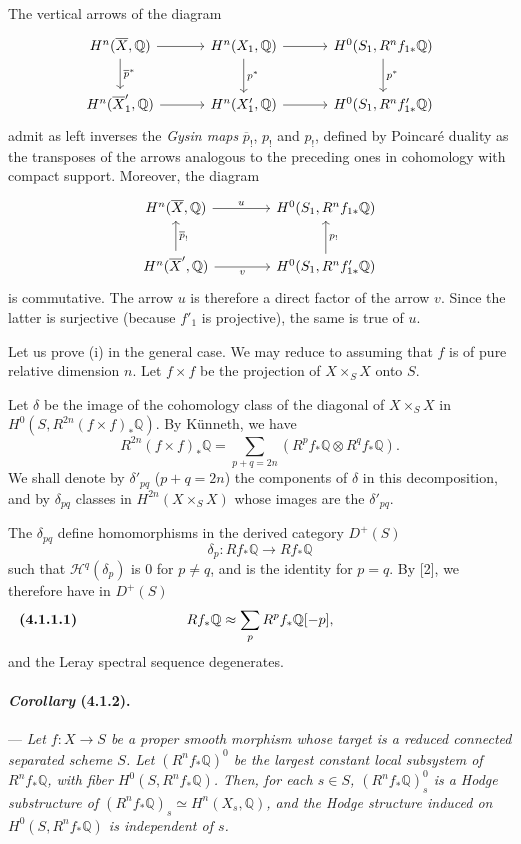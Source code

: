 \documentclass[10pt]{article}
\newcommand{\Q}{\mathbb Q}
\begin{document}
The vertical arrows of the diagram
\[
\begin{tikzcd}[column sep=3.2em,row sep=2.2em]
H^n(\overline X,\Q) \arrow[r] \arrow[d,"\overline p^*"] &
H^n(X_1,\Q) \arrow[r] \arrow[d,"p^*"] &
H^0(S_1,R^nf_{1*}\Q) \arrow[d,"p^*"]\\
H^n(\overline X'_1,\Q) \arrow[r] &
H^n(X'_1,\Q) \arrow[r] &
H^0(S_1,R^nf'_{1*}\Q)
\end{tikzcd}
\]
admit as left inverses the \emph{Gysin maps} $\overline p_!$, $p_!$ and $p_!$, defined by Poincaré duality as the transposes of the arrows analogous to the preceding ones in cohomology with compact support. Moreover, the diagram
\[
\begin{tikzcd}[column sep=4em,row sep=2.2em]
H^n(\overline X,\Q) \arrow[r,"u"] &
H^0(S_1,R^nf_{1*}\Q)\\
H^n(\overline X',\Q) \arrow[u,"\overline p_!"'] \arrow[r,"v"'] &
H^0(S_1,R^nf'_{1*}\Q) \arrow[u,"p_!"']
\end{tikzcd}
\]
is commutative. The arrow $u$ is therefore a direct factor of the arrow $v$. Since the latter is surjective (because $f'_1$ is projective), the same is true of $u$.

Let us prove (i) in the general case. We may reduce to assuming that $f$ is of pure relative dimension $n$. Let $f\times f$ be the projection of $X\times_SX$ onto $S$.

Let $\delta$ be the image of the cohomology class of the diagonal of $X\times_SX$ in  $H^0(S,R^{2n}(f\times f)_*\Q)$.  By Künneth, we have
\[
R^{2n}(f\times f)_*\Q=
\sum_{p+q=2n}(R^pf_*\Q\otimes R^qf_*\Q).
\]
We shall denote by $\delta'_{pq}$ ($p+q=2n$) the components of $\delta$ in this decomposition, and by $\delta_{pq}$ classes in $H^{2n}(X\times_SX)$ whose images are the $\delta'_{pq}$.

The $\delta_{pq}$ define homomorphisms in the derived category $D^+(S)$
\[
\delta_p:Rf_*\Q\longrightarrow Rf_*\Q
\]
such that $\mathcal H^q(\delta_p)$ is $0$ for $p\ne q$, and is the identity for $p=q$. By [2], we therefore have in $D^+(S)$
\[
\makebox[\textwidth][s]{\textbf{(4.1.1.1)}\hfill$\displaystyle Rf_*\Q\approx\sum_p R^pf_*\Q[-p],$\hfill\phantom{\textbf{(4.1.1.1)}}}
\]
and the Leray spectral sequence degenerates.

\paragraph{\emph{Corollary} (4.1.2).} --- {\itshape Let $f:X\to S$ be a proper smooth morphism whose target is a reduced connected separated scheme $S$. Let $(R^nf_*\Q)^0$ be the largest constant local subsystem of $R^nf_*\Q$, with fiber $H^0(S,R^nf_*\Q)$. Then, for each $s\in S$, $(R^nf_*\Q)^0_s$ is a Hodge substructure of $(R^nf_*\Q)_s\simeq H^n(X_s,\Q)$, and the Hodge structure induced on $H^0(S,R^nf_*\Q)$ is independent of $s$.}
\end{document}
